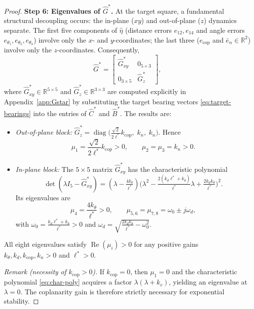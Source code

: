 \begin{proof}
\medskip\noindent\textbf{Step 6: Eigenvalues of \(\hat G^*\).}\quad
At the target square, a fundamental structural decoupling occurs: the in-plane (\(xy\)) and out-of-plane (\(z\)) dynamics separate. The first five components of \(\hat\eta\) (distance errors \(e_{12},e_{14}\) and angle errors \(e_{\theta_1},e_{\theta_2},e_{\theta_4}\)) involve only the \(x\)- and \(y\)-coordinates; the last three (\(e_{\mathrm{cop}}\) and \(\bar e_n\in\mathbb R^2\)) involve only the \(z\)-coordinates. Consequently,
\begin{equation}
\hat G^* = \begin{bmatrix}
\hat G^*_{xy} & 0_{5\times 3}\\[2pt]
0_{3\times 5} & \hat G^*_{z}
\end{bmatrix},
\label{eq:Gstar-block}
\end{equation}
where \(\hat G^*_{xy}\in\mathbb R^{5\times 5}\) and \(\hat G^*_{z}\in\mathbb R^{3\times 3}\) are computed explicitly in Appendix~\ref{app:Gstar} by substituting the target bearing vectors \eqref{eq:target-bearings} into the entries of \(\hat C^*\) and \(\hat B^*\). The results are:
\begin{itemize}[leftmargin=*,itemsep=0pt,topsep=2pt]
\item \emph{Out-of-plane block:} \(\hat G^*_{z}=\operatorname{diag}\bigl(\frac{\sqrt2}{2\ell^*}k_{\mathrm{cop}},\;k_n,\;k_n\bigr)\). Hence
\begin{equation}
\mu_{1}=\frac{\sqrt2}{2\ell^*}k_{\mathrm{cop}}>0,\qquad
\mu_{2}=\mu_{3}=k_n>0.
\label{eq:mu-out}
\end{equation}
\item \emph{In-plane block:} The \(5\times 5\) matrix \(\hat G^*_{xy}\) has the characteristic polynomial
\[
\det(\lambda I_5-\hat G^*_{xy})
=(\lambda-\tfrac{4k_\theta}{\ell^*})
\bigl(\lambda^{2}-\tfrac{2(k_d\ell^*+k_\theta)}{\ell^*}\lambda+\tfrac{2k_d k_\theta}{\ell^*}\bigr)^{2}.
\]
Its eigenvalues are
\begin{equation}
\mu_{4}=\frac{4k_\theta}{\ell^*}>0,\qquad
\mu_{5,6}=\mu_{7,8}=\omega_0\pm j\omega_d,
\label{eq:mu-in}
\end{equation}
with \(\omega_0=\frac{k_d\ell^*+k_\theta}{\ell^*}>0\) and \(\omega_d=\sqrt{\frac{2k_d k_\theta}{\ell^*}-\omega_0^{2}}\).
\end{itemize}
All eight eigenvalues satisfy \(\operatorname{Re}(\mu_i)>0\) for any positive gains \(k_\theta,k_d,k_{\mathrm{cop}},k_n>0\) and \(\ell^*>0\).

\emph{Remark (necessity of \(k_{\mathrm{cop}}>0\)).} If \(k_{\mathrm{cop}}=0\), then \(\mu_{1}=0\) and the characteristic polynomial \eqref{eq:char-poly} acquires a factor \(\lambda(\lambda+k_v)\), yielding an eigenvalue at \(\lambda=0\). The coplanarity gain is therefore strictly necessary for exponential stability.


\end{proof}

